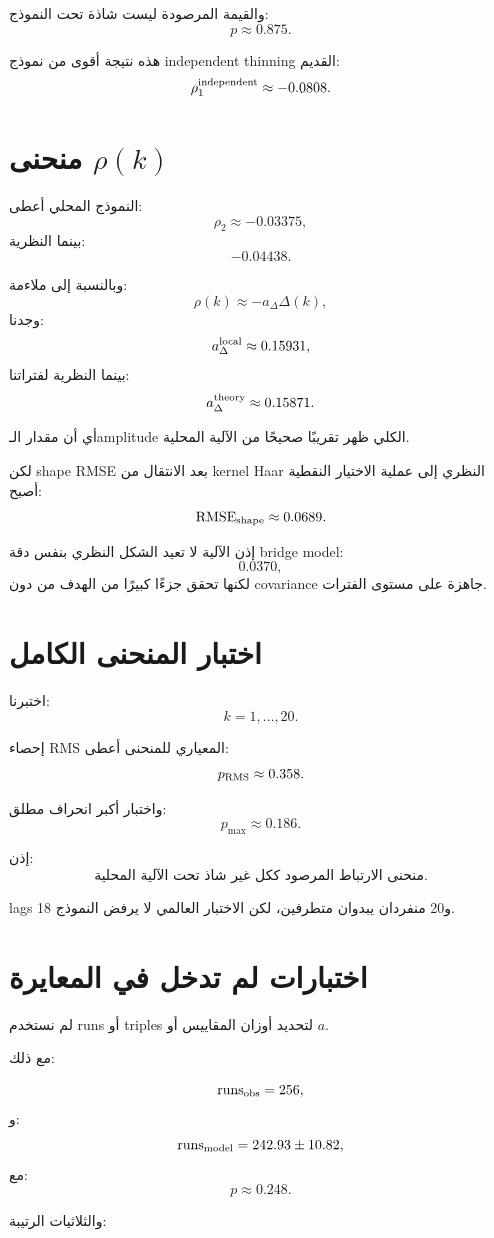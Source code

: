 \documentclass[12pt]{article}
\begin{document}
والقيمة المرصودة ليست شاذة تحت النموذج:
\[
p\approx0.875.
\]

هذه نتيجة أقوى من نموذج independent thinning القديم:
\[
\rho_1^{\rm independent}\approx-0.0808.
\]

\section{منحنى \(\rho(k)\)}

النموذج المحلي أعطى:
\[
\rho_2\approx-0.03375,
\]
بينما النظرية:
\[
-0.04438.
\]

وبالنسبة إلى ملاءمة:
\[
\rho(k)\approx-a_\Delta\Delta(k),
\]
وجدنا:
\[
a_\Delta^{\rm local}\approx0.15931,
\]
بينما النظرية لفتراتنا:
\[
a_\Delta^{\rm theory}\approx0.15871.
\]

أي أن مقدار الـamplitude الكلي ظهر تقريبًا صحيحًا من الآلية المحلية.

لكن shape RMSE بعد الانتقال من kernel Haar النظري إلى عملية الاختيار النقطية أصبح:
\[
\mathrm{RMSE}_{\rm shape}\approx0.0689.
\]

إذن الآلية لا تعيد الشكل النظري بنفس دقة bridge model:
\[
0.0370,
\]
لكنها تحقق جزءًا كبيرًا من الهدف من دون covariance جاهزة على مستوى الفترات.

\section{اختبار المنحنى الكامل}

اختبرنا:
\[
k=1,\ldots,20.
\]

إحصاء RMS المعياري للمنحنى أعطى:
\[
p_{\rm RMS}\approx0.358.
\]

واختبار أكبر انحراف مطلق:
\[
p_{\max}\approx0.186.
\]

إذن:
\[
\boxed{
\text{منحنى الارتباط المرصود ككل غير شاذ تحت الآلية المحلية.}
}
\]

lags 18 و20 منفردان يبدوان متطرفين، لكن الاختبار العالمي لا يرفض النموذج.

\section{اختبارات لم تدخل في المعايرة}

لم نستخدم runs أو triples لتحديد أوزان المقاييس أو \(a\).

مع ذلك:

\[
\mathrm{runs}_{\rm obs}=256,
\]
و:
\[
\mathrm{runs}_{\rm model}=242.93\pm10.82,
\]
مع:
\[
p\approx0.248.
\]

والثلاثيات الرتيبة:
\end{document}
